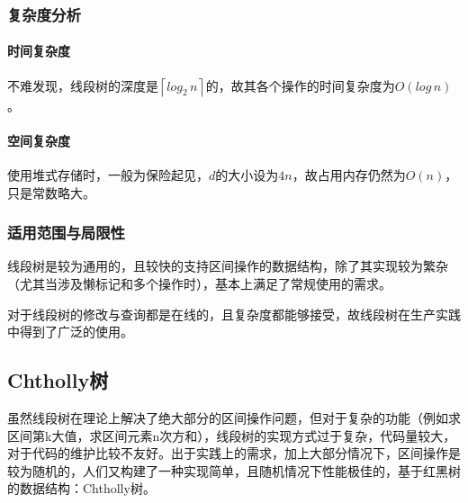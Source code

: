 \documentclass{cjc}
\begin{document}
\subsubsection{复杂度分析}
\paragraph{时间复杂度} 不难发现，线段树的深度是$\left \lceil log_2\,n \right \rceil $的，故其各个操作的时间复杂度为$O(log\,n)$。%
\paragraph{空间复杂度} 使用堆式存储时，一般为保险起见，$d$的大小设为$4n$，故占用内存仍然为$O(n)$，只是常数略大。
\subsubsection{适用范围与局限性}
线段树是较为通用的，且较快的支持区间操作的数据结构，除了其实现较为繁杂（尤其当涉及懒标记和多个操作时），基本上满足了常规使用的需求。

对于线段树的修改与查询都是在线的，且复杂度都能够接受，故线段树在生产实践中得到了广泛的使用。

\subsection{Chtholly树}

虽然线段树在理论上解决了绝大部分的区间操作问题，但对于复杂的功能（例如求区间第k大值，求区间元素n次方和），线段树的实现方式过于复杂，代码量较大，对于代码的维护比较不友好。出于实践上的需求，加上大部分情况下，区间操作是较为随机的，人们又构建了一种实现简单，且随机情况下性能极佳的，基于红黑树的数据结构：Chtholly树。
\end{document}
